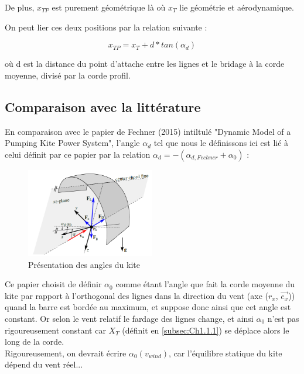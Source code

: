 De plus, $x_{TP}$ est purement géométrique là où $x_T$ lie géométrie et aérodynamique.

On peut lier ces deux positions par la relation suivante : 

\begin{equation}
    x_{TP} = x_T + d * tan(\alpha_d)
    \label{eq:Xtp}
\end{equation}

où d est la distance du point d’attache entre les lignes et le bridage à la corde moyenne, divisé par la corde profil.

\subsection{Comparaison avec la littérature} 
\label{subsec:Ch1.1.3}

En comparaison avec le papier de Fechner (2015) intiltulé "Dynamic Model of a Pumping Kite Power System", l'angle $\alpha_d$ tel que nous le définissons ici est lié à celui définit par ce papier par la relation $\alpha_d = -(\alpha_{d, Fechner} + \alpha_0)$ : 

\begin{figure}[H]
    \centering
    \includegraphics[width=0.5\textwidth]{Pics/01 - xt et towpoint/fechner alpha d.png}  
    \caption{Présentation des angles du kite}
    \label{fig:fechner alpha d}
\end{figure}

Ce papier choisit de définir $\alpha_0$ comme étant l'angle que fait la corde moyenne du kite par rapport à l'orthogonal des lignes dans la direction du vent (axe ($r_x$, $\overrightarrow{e_x}$)) quand la barre est bordée au maximum, et suppose donc ainsi que cet angle est constant. Or selon le vent relatif le fardage des lignes change, et ainsi $\alpha_0$ n'est pas rigoureusement constant car $X_T$ (définit en \ref{subsec:Ch1.1.1}) se déplace alors le long de la corde.\\

Rigoureusement, on devrait écrire $\alpha_0(v_{wind})$, car l'équilibre statique du kite dépend du vent réel...\\

